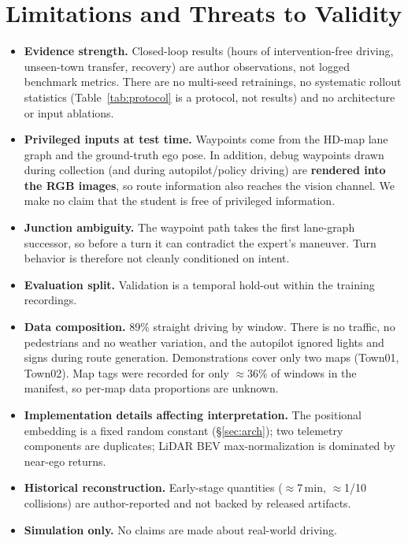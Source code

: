 \documentclass[11pt]{article}
\begin{document}
\section{Limitations and Threats to Validity}
\label{sec:limitations}

\begin{itemize}
  \item \textbf{Evidence strength.} Closed-loop results (hours of intervention-free driving, unseen-town transfer, recovery) are author observations, not logged benchmark metrics. There are no multi-seed retrainings, no systematic rollout statistics (Table~\ref{tab:protocol} is a protocol, not results) and no architecture or input ablations.
  \item \textbf{Privileged inputs at test time.} Waypoints come from the HD-map lane graph and the ground-truth ego pose. In addition, debug waypoints drawn during collection (and during autopilot/policy driving) are \textbf{rendered into the RGB images}, so route information also reaches the vision channel. We make no claim that the student is free of privileged information.
  \item \textbf{Junction ambiguity.} The waypoint path takes the first lane-graph successor, so before a turn it can contradict the expert's maneuver. Turn behavior is therefore not cleanly conditioned on intent.
  \item \textbf{Evaluation split.} Validation is a temporal hold-out within the training recordings.
  \item \textbf{Data composition.} 89\% straight driving by window. There is no traffic, no pedestrians and no weather variation, and the autopilot ignored lights and signs during route generation. Demonstrations cover only two maps (Town01, Town02). Map tags were recorded for only $\approx$36\% of windows in the manifest, so per-map data proportions are unknown.
  \item \textbf{Implementation details affecting interpretation.} The positional embedding is a fixed random constant (\S\ref{sec:arch}); two telemetry components are duplicates; LiDAR BEV max-normalization is dominated by near-ego returns.
  \item \textbf{Historical reconstruction.} Early-stage quantities ($\approx$7\,min, $\approx$1/10 collisions) are author-reported and not backed by released artifacts.
  \item \textbf{Simulation only.} No claims are made about real-world driving.
\end{itemize}
\end{document}
